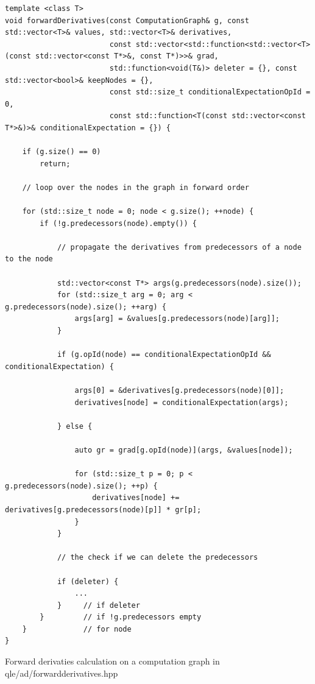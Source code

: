 \documentclass[12pt, a4paper]{report}
\begin{document}
\begin{listing}
\begin{verbatim}
template <class T>
void forwardDerivatives(const ComputationGraph& g, const std::vector<T>& values, std::vector<T>& derivatives,
                        const std::vector<std::function<std::vector<T>(const std::vector<const T*>&, const T*)>>& grad,
                        std::function<void(T&)> deleter = {}, const std::vector<bool>& keepNodes = {},
                        const std::size_t conditionalExpectationOpId = 0,
                        const std::function<T(const std::vector<const T*>&)>& conditionalExpectation = {}) {

    if (g.size() == 0)
        return;

    // loop over the nodes in the graph in forward order

    for (std::size_t node = 0; node < g.size(); ++node) {
        if (!g.predecessors(node).empty()) {

            // propagate the derivatives from predecessors of a node to the node

            std::vector<const T*> args(g.predecessors(node).size());
            for (std::size_t arg = 0; arg < g.predecessors(node).size(); ++arg) {
                args[arg] = &values[g.predecessors(node)[arg]];
            }

            if (g.opId(node) == conditionalExpectationOpId && conditionalExpectation) {

                args[0] = &derivatives[g.predecessors(node)[0]];
                derivatives[node] = conditionalExpectation(args);

            } else {

                auto gr = grad[g.opId(node)](args, &values[node]);

                for (std::size_t p = 0; p < g.predecessors(node).size(); ++p) {
                    derivatives[node] += derivatives[g.predecessors(node)[p]] * gr[p];
                }
            }

            // the check if we can delete the predecessors

            if (deleter) {
                ...  
            }     // if deleter
        }         // if !g.predecessors empty
    }             // for node
}
\end{verbatim}
\caption{Forward derivaties calculation on a computation graph in qle/ad/forwardderivatives.hpp}
\label{lst:forwardderivatives}
\end{listing}
\end{document}
